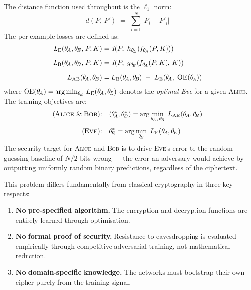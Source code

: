 \documentclass[12pt, a4paper]{article}
\newcommand{\alice}{\textsc{Alice}}
\newcommand{\bob}{\textsc{Bob}}
\newcommand{\eve}{\textsc{Eve}}
\newcommand{\thetaA}{\theta_{\!A}}
\newcommand{\thetaB}{\theta_{\!B}}
\newcommand{\thetaE}{\theta_{\!E}}
\newcommand{\Lbone}{L_{\textsc{B}}}
\newcommand{\Leve}{L_{\textsc{E}}}
\newcommand{\Lab}{L_{\textsc{AB}}}
\begin{document}
\noindent The distance function used throughout is the $\ell_1$ norm:
%
\begin{equation}
  d(P,\, P') \;=\; \sum_{i=1}^{N} \bigl|P_i - P'_i\bigr|
  \label{eq:l1}
\end{equation}
%
The per-example losses are defined as:
%
\begin{align}
  \Leve(\thetaA, \thetaE,\, P, K)
    &= d\!\left(P,\; h_{\thetaE}\!\left(f_{\thetaA}(P,K)\right)\right)
    \label{eq:eve_loss} \\[6pt]
  \Lbone(\thetaA, \thetaB,\, P, K)
    &= d\!\left(P,\; g_{\thetaB}\!\left(f_{\thetaA}(P,K),\, K\right)\right)
    \label{eq:bob_loss} \\[6pt]
  \Lab(\thetaA, \thetaB)
    &= \Lbone(\thetaA, \thetaB)
       \;-\; \Leve\!\left(\thetaA,\; \operatorname{OE}(\thetaA)\right)
    \label{eq:ab_loss}
\end{align}
%
where $\operatorname{OE}(\thetaA) = \arg\min_{\thetaE}\, \Leve(\thetaA, \thetaE)$
denotes the \emph{optimal Eve} for a given \alice{}.
The training objectives are:
%
\begin{align}
  \text{(\alice{} \& \bob{}):} \quad
    & (\thetaA^*, \thetaB^*)
      = \arg\min_{\thetaA,\,\thetaB}\; \Lab(\thetaA, \thetaB)
      \label{eq:ab_opt} \\[4pt]
  \text{(\eve{}):} \quad
    & \thetaE^*
      = \arg\min_{\thetaE}\; \Leve(\thetaA, \thetaE)
      \label{eq:eve_opt}
\end{align}
%
The security target for \alice{} and \bob{} is to drive \eve{}'s error
to the random-guessing baseline of $N/2$ bits wrong — the error an
adversary would achieve by outputting uniformly random binary predictions,
regardless of the ciphertext.

This problem differs fundamentally from classical cryptography in three
key respects:

\begin{enumerate}[leftmargin=2em, itemsep=4pt]
  \item \textbf{No pre-specified algorithm.} The encryption and
        decryption functions are entirely learned through optimisation.
  \item \textbf{No formal proof of security.} Resistance to
        eavesdropping is evaluated empirically through competitive
        adversarial training, not mathematical reduction.
  \item \textbf{No domain-specific knowledge.} The networks must
        bootstrap their own cipher purely from the training signal.
\end{enumerate}
\end{document}
